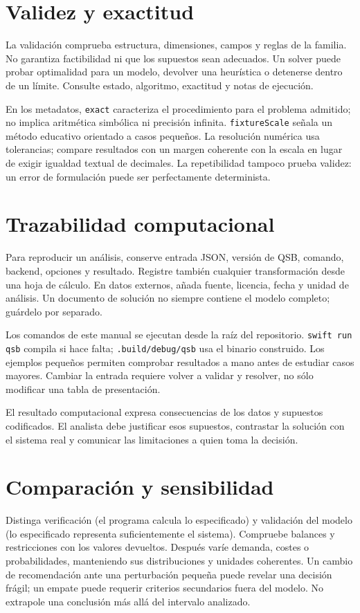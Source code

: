 \section{Validez y exactitud}
La validación comprueba estructura, dimensiones, campos y reglas de la familia.
No garantiza factibilidad ni que los supuestos sean adecuados. Un solver puede
probar optimalidad para un modelo, devolver una heurística o detenerse dentro de
un límite. Consulte estado, algoritmo, exactitud y notas de ejecución.

En los metadatos, \texttt{exact} caracteriza el procedimiento para el problema
admitido; no implica aritmética simbólica ni precisión infinita.
\texttt{fixtureScale} señala un método educativo orientado a casos pequeños.
La resolución numérica usa tolerancias; compare resultados con un margen
coherente con la escala en lugar de exigir igualdad textual de decimales.
La repetibilidad tampoco prueba validez: un error de formulación puede ser
perfectamente determinista.

\section{Trazabilidad computacional}
Para reproducir un análisis, conserve entrada JSON, versión de QSB, comando,
backend, opciones y resultado. Registre también cualquier transformación desde
una hoja de cálculo. En datos externos, añada fuente, licencia, fecha y unidad
de análisis. Un documento de solución no siempre contiene el modelo completo;
guárdelo por separado.

Los comandos de este manual se ejecutan desde la raíz del repositorio.
\texttt{swift run qsb} compila si hace falta; \texttt{.build/debug/qsb} usa el
binario construido. Los ejemplos pequeños permiten comprobar resultados a mano
antes de estudiar casos mayores. Cambiar la entrada requiere volver a validar
y resolver, no sólo modificar una tabla de presentación.

\begin{observacion}
El resultado computacional expresa consecuencias de los datos y supuestos
codificados. El analista debe justificar esos supuestos, contrastar la solución
con el sistema real y comunicar las limitaciones a quien toma la decisión.
\end{observacion}

\section{Comparación y sensibilidad}
Distinga verificación (el programa calcula lo especificado) y validación del
modelo (lo especificado representa suficientemente el sistema). Compruebe
balances y restricciones con los valores devueltos. Después varíe demanda,
costes o probabilidades, manteniendo sus distribuciones y unidades coherentes.
Un cambio de recomendación ante una perturbación pequeña puede revelar una
decisión frágil; un empate puede requerir criterios secundarios fuera del modelo.
No extrapole una conclusión más allá del intervalo analizado.
